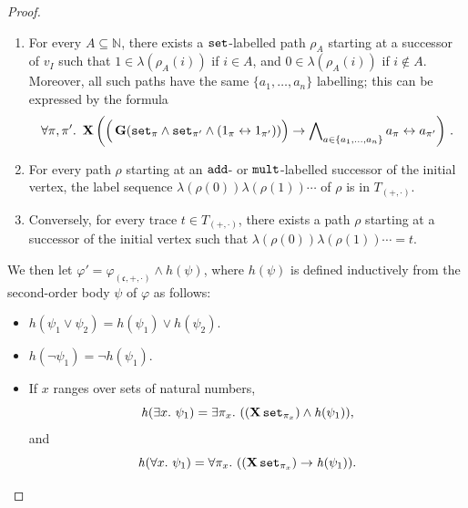\documentclass[dvipsnames,10pt,a4paper]{amsart}
\theoremstyle{definition}
\theoremstyle{remark}
\newcommand{\nats}{\mathbb{N}}
\newcommand\Nat{\nats}
\newcommand{\cont}{\mathfrak{c}}
\newcommand{\initmark}{I}
\newcommand{\G}{\mathop{\mathbf{G}\vphantom{a}}\nolimits}
\newcommand{\X}{\mathop{\mathbf{X}\vphantom{a}}\nolimits}
\newcommand\add{\textup{\texttt{add}}}
\newcommand\mult{\textup{\texttt{mult}}}
\newcommand\pset{\textup{\texttt{set}}}
\newcommand\Top{T_{({+},{\cdot})}}
\newcommand\ai[1]{a_{#1}}
\newcommand\ax{a}
\newcommand\pix[1]{\pi_{#1}}
\newcommand\phiz{\varphi_{(\cont,{+},{\cdot})}}
\newcommand\tr [1]{\mathit{h}(#1)}
\begin{document}
\begin{proof}
\begin{itemize}
\begin{enumerate}
    \item For every $A \subseteq \Nat$, there exists a $\pset$-labelled path
      $\rho_A$ starting at a successor of $v_\initmark$ 
      such that $1 \in \lambda(\rho_A(i))$ if  $i \in A$,
      and $0 \in \lambda(\rho_A(i))$ if  $i \notin A$.
      Moreover, all such paths have the same $\{\ai 1,\ldots,\ai n\}$ labelling;
      this can be expressed by the formula
      \[
        \forall \pi, \pi'.\
        \X\left( \Big(\G (\pset_\pi \land \pset_{\pi'} \land
        (1_\pi \leftrightarrow 1_{\pi'}))\Big) \rightarrow
        \bigwedge\nolimits_{\ax \in \{\ai 1, \ldots, \ai n\}}
        \ax_\pi \leftrightarrow \ax_{\pi'}\right)
        \, .
      \]
    \item For every path $\rho$ starting at an $\add$- or $\mult$-labelled
      successor of the initial vertex, the label sequence
      $\lambda(\rho(0)) \lambda(\rho(1)) \cdots$ of $\rho$ is in $\Top$.

    \item Conversely, for every trace $t \in \Top$, there exists a path
      $\rho$ starting at a successor of the initial vertex such that
      $\lambda(\rho(0)) \lambda(\rho(1)) \cdots = t$.
    \end{enumerate}
  \end{itemize}

  We then let $\varphi' = \phiz  \land \tr  \psi$, where $\tr  \psi$ is defined inductively from the second-order body $\psi$
  of $\varphi$ as follows:
  \begin{itemize}
  \item $\tr {\psi_1 \lor \psi_2} = \tr {\psi_1} \lor \tr {\psi_2}$.
  \item $\tr {\lnot \psi_1} = \lnot \tr {\psi_1}$.
  \item If $x$ ranges over sets of natural numbers,
    \[\tr {\exists x.\ \psi_1} =
    \exists \pix x.\ ((\X \pset_{\pix x}) \land \tr  {\psi_1}),\]
    and
    \[\tr {\forall x.\ \psi_1} =
    \forall \pix x.\ ((\X \pset_{\pix x}) \rightarrow \tr  {\psi_1}).\]


\end{itemize}
\end{proof}
\end{document}
